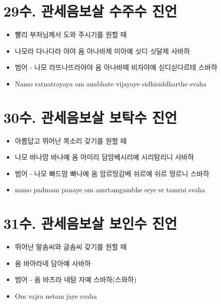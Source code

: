 \documentclass[12pt, a4paper, oneside]{book}
\let\stdsection\section
\renewcommand\section{\newpage\stdsection}
\begin{document}
\section{29수. 관세음보살 수주수 진언}

	 		\begin{itemize}
			\item 빨리 부처님께서 도와 주시기를 원할 때
			\item 나모라 다나다라 야야 옴 아나바제 미아예 싯디 싯달제 사바하
			\item 범어 - 나모 라뜨나뜨라야야 옴 아나바떼 비자야예 싣디싣다르테 스바하
			\item Namo ratnatrayaya om anabhate vijayaye sidhisiddharthe svaha
			\end{itemize}





\section{30수. 관세음보살 보탁수 진언}

	 		\begin{itemize}
			\item 아름답고 뛰어난 목소리 갖기를 원할 때
			\item 나모 바나맘 바나예 옴 아미리 담암베시리예 시리탐리니 사바하
			\item 범어 - 나모 빠드맘 빠나예 옴 암르땅감베 쉬르예 쉬르 땅르니 스바하
			\item namo padmam panaye om amrtamgambhe srye sr tamrni svaha
			\end{itemize}



 


\section{31수. 관세음보살 보인수 진언}

	 		\begin{itemize}
			\item 뛰어난 말솜씨와 글솜씨 갖기를 원할 때
			\item 옴 바아라녜 담아예 사바하
			\item 범어 - 옴 바즈라 네탐 자예 스바하(스와하)
			\item Om vajra netam jaye svaha
			\end{itemize}
\end{document}
